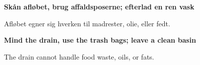 \documentclass{article}
\begin{document}
\maketitle

\null

\vspace{-0.5cm}

\begin{center}

\vspace{1cm}%
\begin{center}%

\fontsize{27}{27}\selectfont\bf Skån afløbet, brug affaldsposerne; efterlad en
ren vask \\

\end{center}%
\vspace{0.7cm}%

\vspace{-0.7cm}

\Huge

Afløbet egner sig hverken til madrester, olie, eller fedt.

\english

\vspace{1.5cm}%
\begin{center}%

\fontsize{27}{27}\selectfont\bf Mind the drain, use the trash bags; leave a
clean basin

\end{center}%
\vspace{0.7cm}%

\vspace{-1.1cm}

The drain cannot handle food waste, oils, or fats.

\end{center}

\dansk

\underskriv
\end{document}
